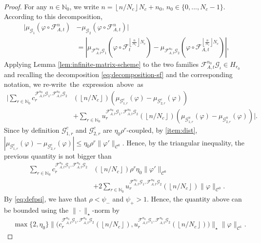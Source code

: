 \documentclass{amsart}
\numberwithin{equation}{section}
\newcommand\vf{\varphi}
\renewcommand{\le}{\leqslant}
\newcommand\cC{{\mathcal C}}
\newcommand\cF{{\mathcal F}}
\newcommand\cG{{\mathcal G}}
\newcommand\bN{{\mathbb N}}
\newcommand{\catt}{\cF_{A,t}}
\begin{document}
\begin{proof}
For any \(n \in \bN_0\), we write \(n = \left\lfloor n/N_c\right\rfloor N_c +n_0\), \(n_0 \in\{0,...,N_c -1\}\). According to this decomposition,
\begin{equation}\label{eq:corr-two-sp}
\begin{split}
    \bigl|\mu_{\cG_1}(\vf \circ \catt^n)& - \mu_{\cG_2} (\vf \circ \catt^n ) \bigr| \\
&= \left|\mu_{\catt^{n_0} \cG_1}(\vf \circ \cF_t^{\left\lfloor \frac{n}{N_c}\right \rfloor N_c}) - \mu_{\catt^{n_0} \cG_2} (\vf \circ \catt^{\left\lfloor \frac{n}{N_c}\right\rfloor N_c})\right|, 
\end{split}
\end{equation}
Applying Lemma \ref{lem:infinite-matrix-scheme} to the two families \(\catt^{n_0}\cG_{\iota} \in H_{r_0}\) and recalling the decomposition \eqref{eq:decomposition-sf} and the corresponding notation, we \mbox{re-write the expression above as}
\[
\begin{split}
    \biggl|\sum_{r \in \bN_0} c_r^{\catt^{n_0} \cG_1, \catt^{n_0} \cG_2} &\left(\left\lfloor n/N_c \right\rfloor\right) (\mu_{\cG_{1,r}^c}(\vf) - \mu_{\cG_{2,r}^c}(\vf)) \\
&+ \sum_{r \in \bN_0} u_r^{\catt^{n_0} \cG_1, \catt^{n_0} \cG_2} \left(\left\lfloor  n/N_c\right\rfloor\right) (\mu_{\cG_{1,r}^u}(\vf) - \mu_{\cG_{2,r}^u}(\vf)) \biggr|.
\end{split}
\]
Since by definition \(\cG_{1,r}^c\) and \(\cG_{2,r}^c\) are \(\eta_0 \rho^r\)-coupled, by \ref{item:dist}, \(|\mu_{\cG_{1,r}^c}(\vf) - \mu_{\cG_{2,r}^c}(\vf)| \le \eta_0 \rho^{r} \|\vf'\|_{\cC^0}\). Hence, by the triangular inequality, the previous quantity is not bigger than
\[
\begin{split}
\sum_{r \in \bN_0} c_r^{\catt^{n_0} \cG_1, \catt^{n_0} \cG_2} &\left(\left\lfloor  n/N_c\right\rfloor\right)\rho^{r}\eta_0\|\vf'\|_{\cC^0} \\
&+ 2\sum_{r \in \bN_0} u_r^{\catt^{n_0} \cG_1, \catt^{n_0} \cG_2} \left(\left\lfloor  n/N_c\right\rfloor\right)\|\vf\|_{\cC^0}.
\end{split}
\]
By \eqref{eq:defpsi}, we have that \(\rho < \psi_-\) and \(\psi_+ > 1\). Hence, the quantity above can be bounded using the \(\|\cdot\|_{\star}\)-norm by
\[
\begin{split}
      &\max\{2,\eta_0\}\biggl\|\bigl(c_r^{\catt^{n_0} \cG_1, \catt^{n_0} \cG_2}\left(\left\lfloor  n/N_c \right\rfloor \right), u_r^{\catt^{n_0} \cG_1, \catt^{n_0} \cG_2}  \left (\left\lfloor  n/N_c \right \rfloor \right)\bigr)\biggr\|_{\star}\|\vf\|_{\cC^1}.

\end{split}\]
\end{proof}
\end{document}
